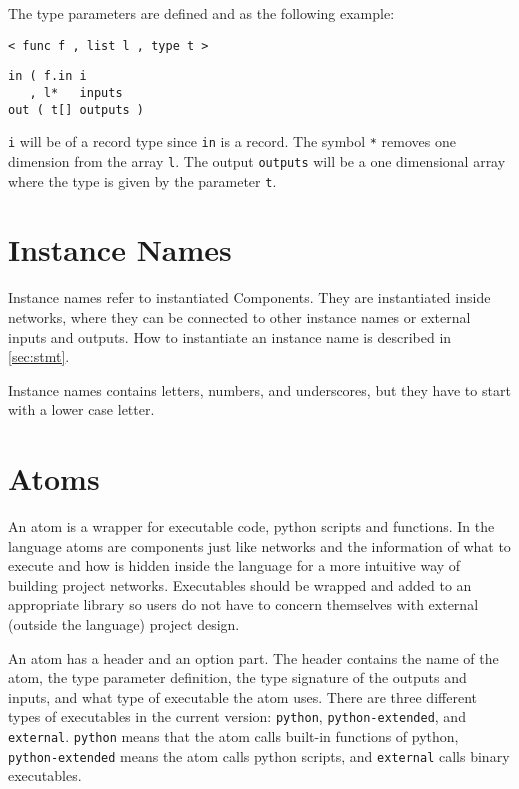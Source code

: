 The type parameters are defined and as the following example:

\begin{verbatim}
< func f , list l , type t >
\end{verbatim}

\begin{verbatim}
in ( f.in i
   , l*   inputs
out ( t[] outputs )
\end{verbatim}

\verb#i# will be of a record type since \verb#in# is a record. The
symbol \verb#*# removes one dimension from the array \verb#l#. The
output \verb#outputs# will be a one dimensional array where the type
is given by the parameter \verb#t#.





\section{Instance Names}
Instance names refer to instantiated Components. They are instantiated
inside networks, where they can be connected to other instance names
or external inputs and outputs. How to instantiate an instance name is
described in \autoref{sec:stmt}.

Instance names contains letters, numbers, and underscores, but they
have to start with a lower case letter.


\section{Atoms}\label{sec:atom}
An atom is a wrapper for executable code, python scripts and
functions. In the language atoms are components just like networks and
the information of what to execute and how is hidden inside the
language for a more intuitive way of building project
networks. Executables should be wrapped and added to an appropriate
library so users do not have to concern themselves with external
(outside the language) project design.

An atom has a header and an option part. The header contains the name
of the atom, the type parameter definition, the type signature of the
outputs and inputs, and what type of executable the atom uses. There
are three different types of executables in the current version:
\verb#python#, \verb#python-extended#, and
\verb#external#. \verb#python# means that the atom calls built-in
functions of python, \verb#python-extended# means the atom calls
python scripts, and \verb#external# calls binary executables.


